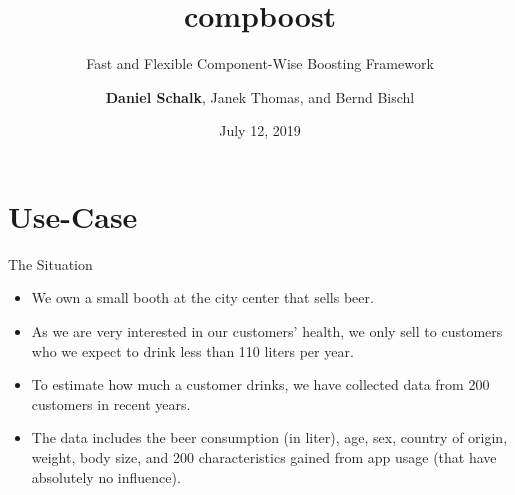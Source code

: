 \documentclass[10pt]{beamer}\usepackage[]{graphicx}\usepackage[]{color}
\title{compboost}
\subtitle{Fast and Flexible Component-Wise Boosting Framework}
\date{July 12, 2019}
\author{\textbf{Daniel Schalk}, Janek Thomas, and Bernd Bischl}
\institute{LMU Munich\\Working Group Computational Statistics}
\begin{document}



\maketitle



\section{Use-Case}

\begin{frame}{The Situation}

\begin{itemize}
  \item
    We own a small booth at the city center that sells beer.

  \item
    As we are very interested in our customers' health, we only sell to customers who we expect to drink less than 110 liters per year.

  \item
    To estimate how much a customer drinks, we have collected data from 200 customers in recent years.

  \item
    The data includes the beer consumption (in liter), age, sex, country of origin, weight, body size, and 200 characteristics gained from app usage (that have absolutely no influence).
\end{itemize}

\end{frame}
\end{document}
